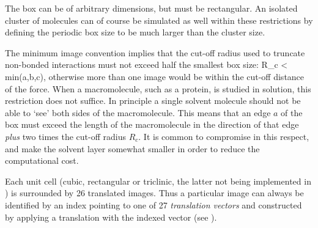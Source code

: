 The box can be of arbitrary dimensions, but must be rectangular. An
isolated cluster of molecules can of course be simulated as well
within these restrictions by defining the periodic box size to be much
larger than the cluster size.

The minimum image convention implies that the cut-off radius used to
truncate non-bonded interactions must not exceed half the smallest box
size:
\beq
  R_c < \half min(a,b,c),
\eeq
otherwise more than one image would be within the cut-off distance of
the force. When a macromolecule, such as a protein, is studied in
solution,  this restriction does not suffice. In principle a single
solvent  molecule should not be able
to `see' both sides of the macromolecule. This means that an edge $a$
of the box must exceed the length of the macromolecule in the
direction of that edge {\em plus} two times the cut-off radius $R_c$.
It is common to compromise in this respect, and make the solvent layer
somewhat smaller in order to reduce the computational cost.

Each unit cell (cubic, rectangular or triclinic, the latter not being
implemented in {\gromacs}) is surrounded by 26 translated images. Thus a
particular image can always be identified by an index pointing to one
of 27 {\em translation vectors} and constructed by applying a
translation with the indexed vector (see ).

